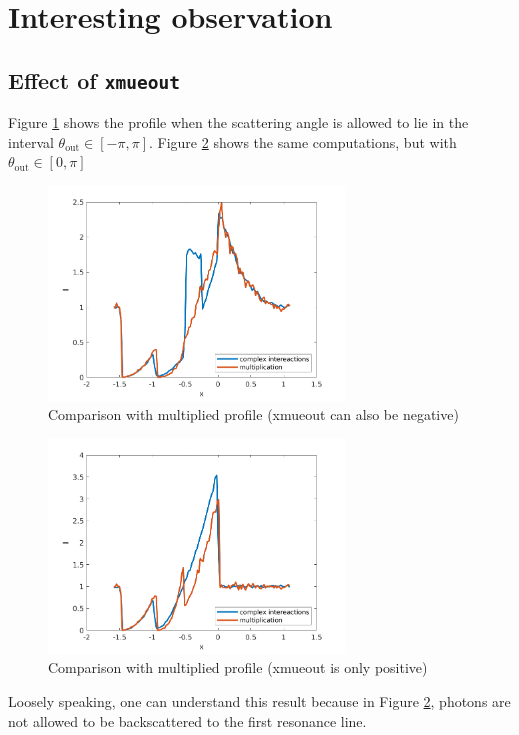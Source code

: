 \documentclass[../main/main.tex]{subfiles}
\begin{document}
\section{Interesting observation}

\subsection{Effect of \texttt{xmueout}}
Figure \ref{profile_vs_multiplication_xmueout_iso} shows the profile when the scattering angle is allowed to lie in the interval $\theta_{\text{out}} \in [-\pi, \pi]$. Figure \ref{profile_vs_multiplication_xmueout_pos} shows the same computations, but with $\theta_{\text{out}} \in [0, \pi]$

\begin{figure}[!htp]
\centering
\includegraphics[width=0.7\textwidth]{../../two_resonance_lines/figures/multiplication_vs_complex_interactions_xmueout_iso.png}
\caption{Comparison with multiplied profile (xmueout can also be negative)}
\label{profile_vs_multiplication_xmueout_iso}
\end{figure}

\begin{figure}[!htp]
\centering
\includegraphics[width=0.7\textwidth]{../../two_resonance_lines/figures/multiplication_vs_complex_interactions_xmueout_pos.png}
\caption{Comparison with multiplied profile (xmueout is only  positive)}
\label{profile_vs_multiplication_xmueout_pos}
\end{figure}

Loosely speaking, one can understand this result because in Figure \ref{profile_vs_multiplication_xmueout_pos}, photons are not allowed to be backscattered to the first resonance line.
\end{document}
